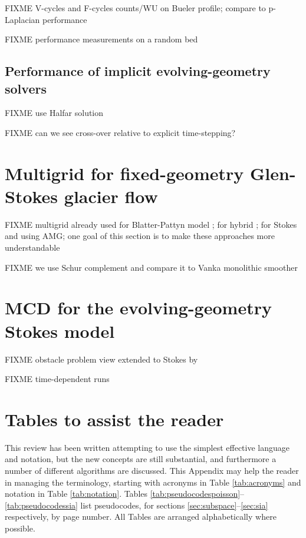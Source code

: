 \documentclass[letterpaper,final,12pt,reqno]{amsart}
\theoremstyle{claim}
\newcommand{\pp}{{\text{p}}}
\numberwithin{equation}{section}
\numberwithin{figure}{section}
\numberwithin{table}{section}
\numberwithin{theorem}{section}
\begin{document}
FIXME V-cycles and F-cycles counts/WU on Bueler profile; compare to $\pp$-Laplacian performance

FIXME performance measurements on a random bed

\subsection{Performance of implicit evolving-geometry solvers} \label{subsec:siaimplicit}  FIXME use Halfar solution

FIXME can we see cross-over relative to explicit time-stepping?


\section{Multigrid for fixed-geometry Glen-Stokes glacier flow} \label{sec:stokes}

FIXME multigrid already used for Blatter-Pattyn model \cite{BrownSmithAhmadia2013}; for hybrid \cite{Jouvetetal2013,JouvetGraeser2013}; for Stokes \cite{IsaacStadlerGhattas2015} and \cite{Tuminaroetal2016} using AMG; one goal of this section is to make these approaches more understandable

FIXME we use Schur complement \cite{Bueler2021,Elmanetal2014} and compare it to Vanka monolithic smoother \cite{Farrelletal2019}


\section{MCD for the evolving-geometry Stokes model} \label{sec:evolvingstokes}

FIXME obstacle problem view extended to Stokes by \cite{WirbelJarosch2020}

FIXME time-dependent runs


\small

\bigskip



\normalsize

\appendix

\section{Tables to assist the reader}

This review has been written attempting to use the simplest effective language and notation, but the new concepts are still substantial, and furthermore a number of different algorithms are discussed.  This Appendix may help the reader in managing the terminology, starting with acronyms in Table \ref{tab:acronyms} and notation in Table \ref{tab:notation}.  Tables \ref{tab:pseudocodespoisson}--\ref{tab:pseudocodessia} list pseudocodes, for sections \ref{sec:subspace}--\ref{sec:sia} respectively, by page number.  All Tables are arranged alphabetically where possible.
\end{document}
